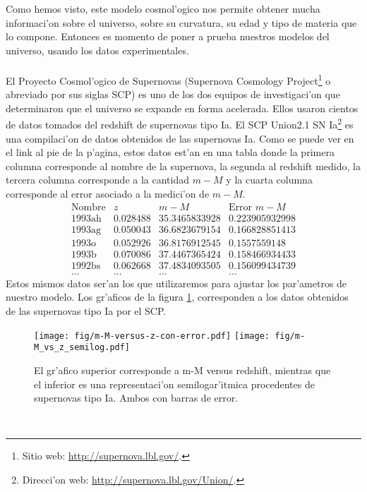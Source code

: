 Como hemos visto, este modelo cosmol'ogico nos permite obtener mucha informaci'on sobre el universo, sobre su curvatura, su edad y tipo de 
materia que lo compone. Entonces es momento de poner a prueba nuestros modelos del universo, usando los datos experimentales.\\ \\
El Proyecto Cosmol'ogico de Supernovas (Supernova Cosmology Project\footnote{Sitio web: \url{http://supernova.lbl.gov/}.} o abreviado por sus siglas SCP) es uno de los dos equipos de investigaci'on que determinaron
que el universo se expande en forma acelerada. Ellos usaron cientos de datos tomados del redshift de supernovas tipo Ia.
El SCP Union2.1 SN Ia\footnote{Direcci'on web: \url{http://supernova.lbl.gov/Union/}.} es una compilaci'on de datos obtenidos de las supernovas Ia.
Como se puede ver en el link al pie de la p'agina, estos datos est'an en una tabla donde la primera columna corresponde al nombre de la
supernova, la segunda al redshift medido, la tercera columna corresponde a la cantidad $m-M$ y la cuarta columna corresponde al error asociado a la medici'on de $m-M$.
\begin{equation}
\begin{array}{lccl}
\mbox{Nombre} & z        &     m-M       & \mbox{Error } m-M\\
1993\mbox{ah} & 0.028488 & 35.3465833928 & 0.223905932998	\\
1993\mbox{ag} & 0.050043 & 36.6823679154 & 0.166828851413	\\
1993\mbox{o}  & 0.052926 & 36.8176912545 & 0.1557559148	\\
1993\mbox{b}  & 0.070086 & 37.4467365424 & 0.158466934433	\\
1992\mbox{bs} & 0.062668 & 37.4834093505 & 0.156099434739	\\
...    & ...	  & ...	      	  & ...
\end{array}
\end{equation}
Estos mismos datos ser'an los que utilizaremos
para ajustar los par'ametros de nuestro modelo. Los gr'aficos de la figura \ref{zvsm-M}, corresponden a los datos obtenidos 
de las supernovas tipo Ia por el SCP.
\begin{figure}[h!]
  \centering
\texttt{[image: fig/m-M-versus-z-con-error.pdf]}
\texttt{[image: fig/m-M\_vs\_z\_semilog.pdf]}
 \caption{El gr'afico superior corresponde a m-M versus redshift, mientras que el inferior es una representaci'on semilogar'itmica procedentes de supernovas tipo Ia. Ambos con barras de error.}
  \label{zvsm-M}
  \end{figure}\\
